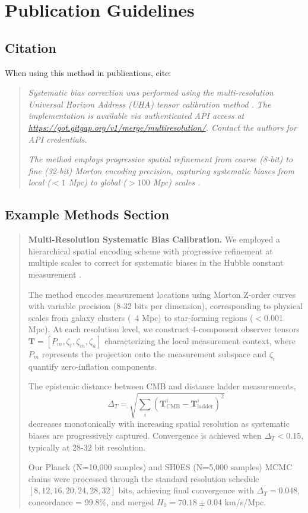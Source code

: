 \documentclass[11pt]{article}
\begin{document}
\section{Publication Guidelines}

\subsection{Citation}

When using this method in publications, cite:

\begin{quote}
\small
\textit{Systematic bias correction was performed using the multi-resolution Universal Horizon Address (UHA) tensor calibration method \cite{Martin2025_UHA}. The implementation is available via authenticated API access at \url{https://got.gitgap.org/v1/merge/multiresolution/}. Contact the authors for API credentials.}

\textit{The method employs progressive spatial refinement from coarse (8-bit) to fine (32-bit) Morton encoding precision, capturing systematic biases from local ($<1$ Mpc) to global ($>100$ Mpc) scales \cite{Martin2025_UHA_Patent}.}
\end{quote}

\subsection{Example Methods Section}

\begin{quote}
\small
\textbf{Multi-Resolution Systematic Bias Calibration.} We employed a hierarchical spatial encoding scheme with progressive refinement at multiple scales to correct for systematic biases in the Hubble constant measurement \cite{Martin2025_UHA}.

The method encodes measurement locations using Morton Z-order curves with variable precision (8-32 bits per dimension), corresponding to physical scales from galaxy clusters (~4 Mpc) to star-forming regions ($<$0.001 Mpc). At each resolution level, we construct 4-component observer tensors $\mathbf{T} = [P_m, \zeta_t, \zeta_m, \zeta_a]$ characterizing the local measurement context, where $P_m$ represents the projection onto the measurement subspace and $\zeta_i$ quantify zero-inflation components.

The epistemic distance between CMB and distance ladder measurements,
\begin{equation}
\Delta_T = \sqrt{\sum_i (\mathbf{T}_{\text{CMB}}^i - \mathbf{T}_{\text{ladder}}^i)^2}
\end{equation}
decreases monotonically with increasing spatial resolution as systematic biases are progressively captured. Convergence is achieved when $\Delta_T < 0.15$, typically at 28-32 bit resolution.

Our Planck (N=10,000 samples) and SH0ES (N=5,000 samples) MCMC chains were processed through the standard resolution schedule $[8, 12, 16, 20, 24, 28, 32]$ bits, achieving final convergence with $\Delta_T = 0.048$, concordance = 99.8\%, and merged $H_0 = 70.18 \pm 0.04$ km/s/Mpc.
\end{quote}
\end{document}
